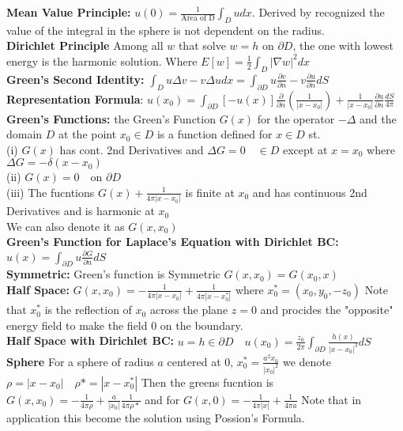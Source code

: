 \documentclass[answers,12pt,addpoints]{exam}
\begin{document}
\textbf{Mean Value Principle:} $u(0) = \frac{1}{\text{Area of D}} \int_{D} u dx$. Derived by recognized the value of the integral in the sphere is not dependent on the radius.\\
\textbf{Dirichlet Principle} Among all $w$ that solve $w = h \text{ on } \partial D$, the one with lowest energy is the harmonic solution. Where $E[w] = \frac{1}{2} \int_{D} |\nabla w|^2 dx$\\
\textbf{Green's Second Identity:} $\int_{D} u \Delta v - v \Delta u dx = \int_{\partial D} u \frac{\partial v}{\partial n} - v \frac{\partial u}{\partial n} dS$\\
\textbf{Representation Formula}: $u(x_0) = \int_{\partial D} [-u(x)] \frac{\partial}{\partial n} (\frac{1}{|x-x_0|}) + \frac{1}{|x-x_0|} \frac{\partial u}{\partial n} \frac{dS}{4\pi}$\\
\textbf{Green's Functions:} the Green's Function $G(x)$ for the operator $-\Delta$ and the domain $D$ at the point $x_0 \in D$ is a function defined for $x\in D$ st. \\
(i) $G(x)$ has cont. 2nd Derivatives and $\Delta G = 0 \quad \in D$ except at $x = x_0$ where $\Delta G = -\delta(x-x_0)$ \\
(ii) $G(x) = 0 \quad \text{on } \partial D$\\
(iii) The fucntions $G(x) + \frac{1}{4\pi|x-x_0|}$ is finite at $x_0$ and has continuous 2nd Derivatives and is harmonic at $x_0$\\
We can also denote it as $G(x,x_0)$\\
\textbf{Green's Function for Laplace's Equation with Dirichlet BC:} $u(x) = \int_{\partial D} u \frac{\partial G}{\partial n} dS$\\
\textbf{Symmetric:} Green's function is Symmetric $G(x,x_0) = G(x_0,x)$\\
\textbf{Half Space:} $G(x,x_0) = -\frac{1}{4\pi |x-x_0|} + \frac{1}{4\pi|x-x_0^*|}$ where $x_0^* = (x_0, y_0, -z_0)$ Note that $x_0^*$ is the reflection of $x_0$ across the plane $z = 0$ and procides the "opposite" energy field to make the field 0 on the boundary.\\
\textbf{Half Space with Dirichlet BC:} $u =h \in \partial D \quad u(x_0) = \frac{z_0}{2\pi} \int_{\partial D} \frac{h(x)}{|x-x_0|^3}dS$\\
\textbf{Sphere} For a sphere of radius $a$ centered at 0, $x_0^* = \frac{a^2x_0}{|x_0|^2}$ we denote $\rho = |x- x_0| \quad \rho* = |x - x_0^*|$ Then the greens fucntion is $G(x,x_0) = -\frac{1}{4\pi \rho} + \frac{a}{|x_0|} \frac{1}{4\pi \rho*}$ and for $G(x,0) = -\frac{1}{4\pi |x|} + \frac{1}{4\pi a}$ Note that in application this become the solution using Possion's Formula.\\\\
\end{document}

